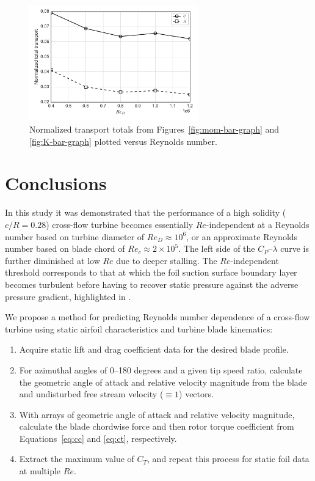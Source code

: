 \documentclass[energies,article,accept,moreauthors,pdftex,12pt,a4paper]{mdpi}
\begin{document}
\begin{figure}[ht!]
\centering
\includegraphics[width=0.65\textwidth]{figures/wake_trans_totals}
\caption{Normalized transport totals from Figures~\ref{fig:mom-bar-graph} and
\ref{fig:K-bar-graph} plotted versus Reynolds number.}
\label{fig:wake-trans-totals}
\end{figure}


\section{Conclusions}

In this study it was demonstrated that the performance of a high solidity
($c/R=0.28$) cross-flow turbine becomes essentially $Re$-independent at a
Reynolds number based on turbine diameter of $Re_D \approx 10^6$, or an
approximate Reynolds number based on blade chord of $Re_c \approx 2 \times
10^5$. The left side of the $C_P$--$\lambda$ curve is further diminished at low
$Re$ due to deeper stalling. The $Re$-independent threshold corresponds to that
at which the foil suction surface boundary layer becomes turbulent before having
to recover static pressure against the adverse pressure gradient, highlighted in
\cite{Lissaman1983, McMasters1980, Carmichael1981}.

We propose a method for predicting Reynolds number dependence of a cross-flow
turbine using static airfoil characteristics and turbine blade kinematics:
\begin{enumerate}
    \item Acquire static lift and drag coefficient data for the desired blade
    profile.
    
    \item For azimuthal angles of 0--180 degrees and a given tip speed ratio,
    calculate the geometric angle of attack and relative velocity magnitude from
    the blade and undisturbed free stream velocity ($\equiv 1$) vectors.
    
    \item With arrays of geometric angle of attack and relative velocity
    magnitude, calculate the blade chordwise force and then rotor torque
    coefficient from Equations~\ref{eq:cc} and \ref{eq:ct}, respectively.
    
    \item Extract the maximum value of $C_T$, and repeat this process for static
    foil data at multiple $Re$.
\end{enumerate}
\end{document}
